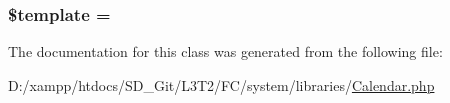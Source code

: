 \subsubsection[{\$template}]{\setlength{\rightskip}{0pt plus 5cm}\$template = \textquotesingle{}\textquotesingle{}}\label{class_c_i___calendar_aa3e9534005fd516d941f6a5569896e01}


The documentation for this class was generated from the following file\+:\begin{DoxyCompactItemize}
\item 
D\+:/xampp/htdocs/\+S\+D\+\_\+\+Git/\+L3\+T2/\+F\+C/system/libraries/\hyperlink{_calendar_8php}{Calendar.\+php}\end{DoxyCompactItemize}

